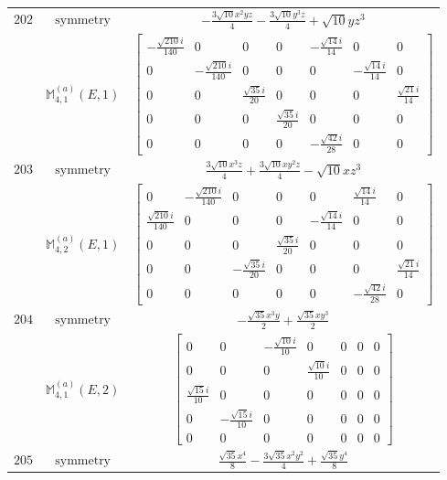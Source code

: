 \documentclass[fleqn,8pt,landscape]{jsarticle}
\begin{document}
\begin{longtable}{ccc}
$ 202 $ & $ \text{symmetry} $ & $ - \frac{3 \sqrt{10} x^{2} y z}{4} - \frac{3 \sqrt{10} y^{3} z}{4} + \sqrt{10} y z^{3} $ \\
$  $ & $ \mathbb{M}_{4,1}^{(a)}(E,1) $ & $ \begin{bmatrix} - \frac{\sqrt{210} i}{140} & 0 & 0 & 0 & - \frac{\sqrt{14} i}{14} & 0 & 0 \\ 0 & - \frac{\sqrt{210} i}{140} & 0 & 0 & 0 & - \frac{\sqrt{14} i}{14} & 0 \\ 0 & 0 & \frac{\sqrt{35} i}{20} & 0 & 0 & 0 & \frac{\sqrt{21} i}{14} \\ 0 & 0 & 0 & \frac{\sqrt{35} i}{20} & 0 & 0 & 0 \\ 0 & 0 & 0 & 0 & - \frac{\sqrt{42} i}{28} & 0 & 0 \end{bmatrix} $ \\ \hline
$ 203 $ & $ \text{symmetry} $ & $ \frac{3 \sqrt{10} x^{3} z}{4} + \frac{3 \sqrt{10} x y^{2} z}{4} - \sqrt{10} x z^{3} $ \\
$  $ & $ \mathbb{M}_{4,2}^{(a)}(E,1) $ & $ \begin{bmatrix} 0 & - \frac{\sqrt{210} i}{140} & 0 & 0 & 0 & \frac{\sqrt{14} i}{14} & 0 \\ \frac{\sqrt{210} i}{140} & 0 & 0 & 0 & - \frac{\sqrt{14} i}{14} & 0 & 0 \\ 0 & 0 & 0 & \frac{\sqrt{35} i}{20} & 0 & 0 & 0 \\ 0 & 0 & - \frac{\sqrt{35} i}{20} & 0 & 0 & 0 & \frac{\sqrt{21} i}{14} \\ 0 & 0 & 0 & 0 & 0 & - \frac{\sqrt{42} i}{28} & 0 \end{bmatrix} $ \\ \hline
$ 204 $ & $ \text{symmetry} $ & $ - \frac{\sqrt{35} x^{3} y}{2} + \frac{\sqrt{35} x y^{3}}{2} $ \\
$  $ & $ \mathbb{M}_{4,1}^{(a)}(E,2) $ & $ \begin{bmatrix} 0 & 0 & - \frac{\sqrt{10} i}{10} & 0 & 0 & 0 & 0 \\ 0 & 0 & 0 & \frac{\sqrt{10} i}{10} & 0 & 0 & 0 \\ \frac{\sqrt{15} i}{10} & 0 & 0 & 0 & 0 & 0 & 0 \\ 0 & - \frac{\sqrt{15} i}{10} & 0 & 0 & 0 & 0 & 0 \\ 0 & 0 & 0 & 0 & 0 & 0 & 0 \end{bmatrix} $ \\ \hline
$ 205 $ & $ \text{symmetry} $ & $ \frac{\sqrt{35} x^{4}}{8} - \frac{3 \sqrt{35} x^{2} y^{2}}{4} + \frac{\sqrt{35} y^{4}}{8} $ \\

\end{longtable}
\end{document}

